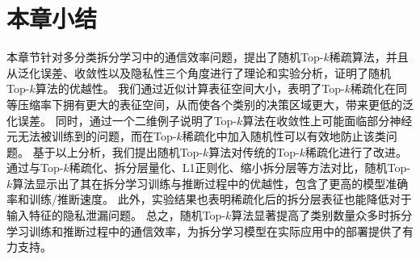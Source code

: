 \section{本章小结}
本章节针对多分类拆分学习中的通信效率问题，提出了随机Top-$k$稀疏算法，并且从泛化误差、收敛性以及隐私性三个角度进行了理论和实验分析，证明了随机Top-$k$算法的优越性。
%
我们通过近似计算表征空间大小，表明了Top-$k$稀疏化在同等压缩率下拥有更大的表征空间，从而使各个类别的决策区域更大，带来更低的泛化误差。
%
同时，通过一个二维例子说明了Top-$k$算法在收敛性上可能面临部分神经元无法被训练到的问题，而在Top-$k$稀疏化中加入随机性可以有效地防止该类问题。
%
基于以上分析，我们提出随机Top-$k$算法对传统的Top-$k$稀疏化进行了改进。
%
通过与Top-$k$稀疏化、拆分层量化、L1正则化、缩小拆分层等方法对比，随机Top-$k$算法显示出了其在拆分学习训练与推断过程中的优越性，包含了更高的模型准确率和训练/推断速度。
%
此外，实验结果也表明稀疏化后的拆分层表征也能降低对于输入特征的隐私泄漏问题。
%
总之，随机Top-$k$算法显著提高了类别数量众多时拆分学习训练和推断过程中的通信效率，为拆分学习模型在实际应用中的部署提供了有力支持。

